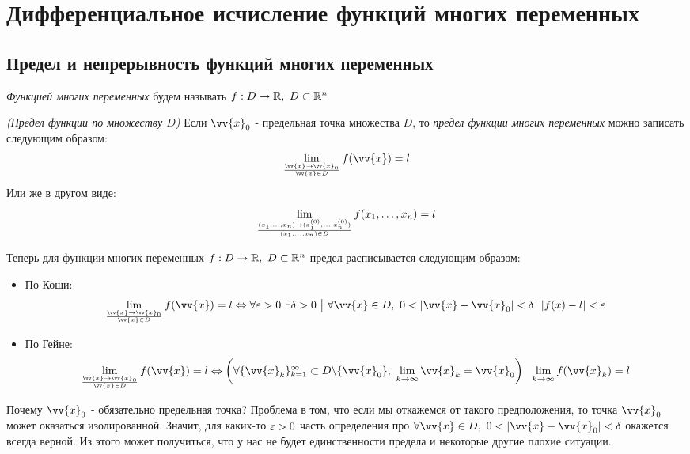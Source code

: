 
\section{Дифференциальное исчисление функций многих переменных}

\subsection{Предел и непрерывность функций многих переменных}

\begin{definition}
	\textit{Функцией многих переменных} будем называть $f: D \to \mathbb{R},\ D \subset \mathbb{R}^n$
\end{definition}

\begin{definition}
	\textit{(Предел функции по множеству $D$)} Если $\vv{x}_0$ - предельная точка множества $D$, то \textit{предел функции многих переменных} можно записать следующим образом:
	\[
		\liml_{\vv{x} \to \vv{x}_0 \over \vv{x} \in D} f(\vv{x}) = l
	\]
	Или же в другом виде:
	\[
		\lim\limits_{(x_1, \ldots, x_n) \to (x_1^{(0)}, \ldots, x_n^{(0)}) \over (x_1, \ldots, x_n) \in D} f(x_1, \ldots, x_n) = l
	\]
	
	Теперь для функции многих переменных $f: D \to \mathbb{R},\ D \subset \mathbb{R}^n$ предел расписывается следующим образом:
	\begin{itemize}
		\item По Коши:
		\[
			\liml_{\vv{x} \to \vv{x}_0 \over \vv{x} \in D} f(\vv{x}) = l \lra \forall \eps > 0\ \exists \delta > 0 \such \forall \vv{x} \in D,\ 0 < |\vv{x} - \vv{x}_0| < \delta\ \ |f(x) - l| < \eps
		\]
		
		\item По Гейне:
		\[
			\liml_{\vv{x} \to \vv{x}_0 \over \vv{x} \in D} f(\vv{x}) = l \lra \left(\forall \{\vv{x}_k\}_{k = 1}^\infty \subset D \bs \{\vv{x}_0\},\ \liml_{k \to \infty} \vv{x}_k = \vv{x}_0\right)\ \ \liml_{k \to \infty} f(\vv{x}_k) = l
		\]
	\end{itemize}
\end{definition}

\begin{note}
	Почему $\vv{x}_0$ - обязательно предельная точка? Проблема в том, что если мы откажемся от такого предположения, то точка $\vv{x}_0$ может оказаться изолированной. Значит, для каких-то $\varepsilon > 0$ часть определения про $\forall \vv{x} \in D,\ 0 < |\vv{x} - \vv{x}_0| < \delta$ окажется всегда верной. Из этого может получиться, что у нас не будет единственности предела и некоторые другие плохие ситуации.
\end{note}

